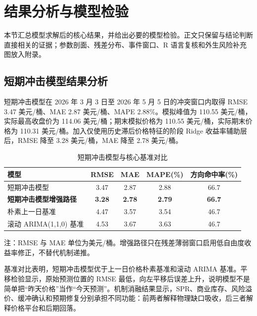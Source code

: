 \section{结果分析与模型检验}

本节汇总模型求解后的核心结果，并给出必要的模型检验。正文只保留与结论判断直接相关的证据；参数剖面、残差分布、事件窗口、R 语言复核和外生风险补充图放入附录。

\subsection{短期冲击模型结果分析}

短期冲击模型在 2026 年 3 月 3 日至 2026 年 5 月 5 日的冲突窗口内取得 RMSE 3.47 美元/桶、MAE 2.87 美元/桶、MAPE 2.88\%。模拟峰值为 110.55 美元/桶，实际最高收盘价为 114.06 美元/桶；期末模拟价格为 110.55 美元/桶，实际期末价格为 110.31 美元/桶。加入仅使用历史滞后价格特征的阶段 Ridge 收益率辅助层后，RMSE 降至 3.28 美元/桶，MAE 降至 2.78 美元/桶。

\begin{table}[!htbp]
\centering
\caption{短期冲击模型与核心基准对比}
\begin{threeparttable}
\begin{tabular}{l S[table-format=1.2] S[table-format=1.2] S[table-format=1.2] S[table-format=2.1]}
\toprule
模型 & {RMSE} & {MAE} & {MAPE(\%)} & {方向命中率(\%)} \\
\midrule
短期冲击模型 & 3.47 & 2.87 & 2.88 & 66.7 \\
\textbf{短期冲击模型增强路径} & \textbf{3.28} & \textbf{2.78} & \textbf{2.79} & \textbf{66.7} \\
朴素上一日基准 & 4.47 & 3.57 & 3.54 & 46.7 \\
滚动 ARIMA(1,1,0) 基准 & 4.53 & 3.67 & 3.63 & 46.7 \\
\bottomrule
\end{tabular}
\begin{tablenotes}
\footnotesize
\item 注：RMSE 与 MAE 单位为美元/桶。增强路径只在残差薄弱窗口启用低自由度收益率修正，不替代机制递推。
\end{tablenotes}
\end{threeparttable}
\end{table}

基准对比表明，短期冲击模型优于上一日价格朴素基准和滚动 ARIMA 基准。平移检验显示，原始预测位置的 RMSE 最低，向左平移后误差上升，说明模型不是简单把“昨天价格”当作“今天预测”。机制消融结果显示，SPR、商业库存、风险溢价、缓冲确认和预期修复分别承担不同功能：前两者解释物理缺口吸收，后三者解释价格平台和后期回落。

